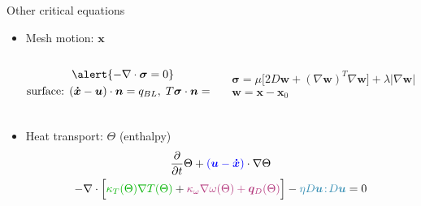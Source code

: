 \begin{frame}{Other critical equations}
  \vspace{-0.3em}
  \begin{itemize}
  \item Mesh motion: $\bm x$
    \begin{columns}
      \begin{column}{0.4\textwidth}
        \vspace{-1.5em}
        \begin{gather*}
          \alert{-\nabla\cdot\bm \sigma = 0} \\
          \text{surface: }(\bm {\dot{x}}- \bm u)\cdot\bm n = q_{BL},\;
          T\bm \sigma \cdot \bm n = 0
        \end{gather*}
      \end{column}
      \begin{column}{0.6\textwidth}
        \begin{gather*}
          \bm \sigma = \mu \Big[ 2 D\bm w + (\nabla \bm w)^T\nabla \bm w \Big] + \lambda|\nabla\bm w|\bm 1 \\
          \bm w = \bm x - \bm x_0 \\
        \end{gather*}
      \end{column}
    \end{columns}
\vspace{-1em}
  \item Heat transport: $\Theta$ (enthalpy)
    \begin{multline*}
      \frac{\partial}{\partial t} \Theta + {\color{blue} (\bm u - \bm{\dot{x}})}\cdot \nabla \Theta \\
      - \nabla\cdot \Big[ {\color{green!70!black} \kappa_T(\Theta)\nabla T(\Theta)} + {\color{magenta!70!black} \kappa_\omega\nabla \omega(\Theta) + \bm q_D(\Theta)} \Big] - {\color{cyan!70!black} \eta D\bm u\tcolon D\bm u} = 0
    \end{multline*}
    \vspace{-0.5em}
    \begin{itemize}
      \begin{columns}
        \begin{column}{0.2\textwidth}\end{column}

\end{columns}
\end{itemize}
\end{itemize}
\end{frame}
